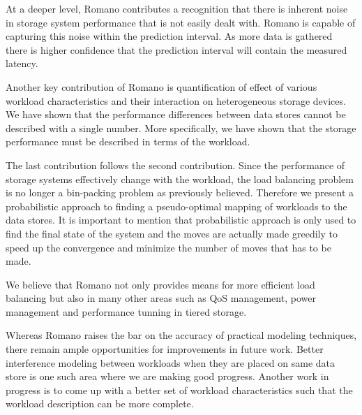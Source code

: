 At a deeper level, Romano contributes a recognition that there is
inherent noise in storage system performance that is not easily dealt
with. Romano is capable of capturing this noise within the prediction
interval. As more data is gathered there is higher confidence that the
prediction interval will contain the measured latency.

Another key contribution of Romano is quantification of effect of
various workload characteristics and their interaction on heterogeneous
storage devices.
We have shown that the performance differences between data stores cannot be described with a single number. More specifically, we have shown that the storage performance must be described in terms of the workload.

The last contribution follows the second contribution. Since the performance of storage systems effectively change with the workload, the load balancing problem is no longer a bin-packing problem as previously believed.
Therefore we present a probabilistic approach to finding a pseudo-optimal mapping of workloads to the data stores.
It is important to mention that probabilistic approach is only used to find the final state of the system and the moves are actually made greedily to speed up the convergence and minimize the number of moves that has to be made.

We believe that Romano not only provides means for more efficient load
balancing but also in many other areas such as QoS management, power management and performance tunning in tiered storage.

Whereas Romano raises the bar on the accuracy of practical modeling
techniques, there remain ample opportunities for improvements in
future work. Better interference modeling between workloads when they
are placed on same data store is one such area where we are making
good progress. Another work in progress is to come up with a better
set of workload characteristics such that the workload description can
be more complete.
~
